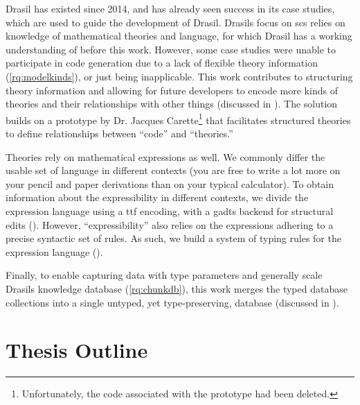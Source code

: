 
Drasil has existed since 2014, and has already seen success in its case studies,
which are used to guide the development of Drasil. Drasils focus on \acs{scs}
relies on knowledge of mathematical theories and language, for which Drasil has
a working understanding of before this work. However, some case studies were
unable to participate in code generation due to a lack of flexible theory
information (\ref{rq:modelkinds}), or just being inapplicable. This work
contributes to structuring theory information and allowing for future developers
to encode more kinds of theories and their relationships with other things
(discussed in ). The solution builds on a prototype by Dr.
Jacques Carette\footnote{Unfortunately, the code associated with the prototype
had been deleted.} that facilitates structured theories to define relationships
between ``code'' and ``theories.''


Theories rely on mathematical expressions as well. We commonly differ the usable
set of language in different contexts (you are free to write a lot more on your
pencil and paper derivations than on your typical calculator). To obtain
information about the expressibility in different contexts, we divide the
expression language using a \acs{ttf} \cite{Carette2009} encoding, with a
\acsp{gadt} backend for structural edits (). However,
``expressibility'' also relies on the expressions adhering to a precise
syntactic set of rules. As such, we build a system of typing rules for the
expression language ().

Finally, to enable capturing data with type parameters and generally scale
Drasils knowledge database (\ref{rq:chunkdb}), this work merges the typed
database collections into a single untyped, yet type-preserving, database
(discussed in ).

\section{Thesis Outline}
\label{sec:intro:outline}

